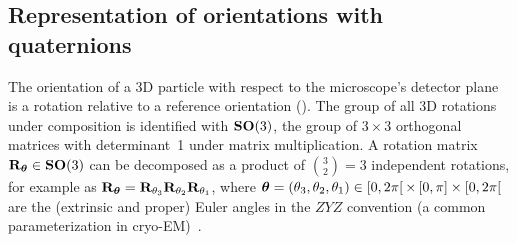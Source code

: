 
\subsection{Representation of orientations with quaternions}\label{sec:method:orientation-representation}

The orientation of a 3D particle with respect to the microscope's detector plane is a rotation relative to a reference orientation ().
The group of all 3D rotations under composition is identified with $\mathrm{\mathbf{SO}}(3)$, the group of $3 \times 3$ orthogonal matrices with determinant~1 under matrix multiplication.
A rotation matrix $\mathbf{R}_{{\boldsymbol{\theta}}} \in \mathrm{\mathbf{SO}}(3)$ can be decomposed as a product of $\binom{3}{2}=3$ independent rotations, for example as $\mathbf{R}_{{\boldsymbol{\theta}}} = \mathbf{R}_{\theta_3} \mathbf{R}_{\theta_2} \mathbf{R}_{\theta_1}$, where ${\boldsymbol{\theta}} = (\theta_3,\theta_2,\theta_1) \in [0,2\pi[ \, \times \, [0,\pi] \times [0,2\pi[$ are the (extrinsic and proper) Euler angles in the $ZYZ$ convention (a common parameterization in cryo-EM)~\cite{sorzano2014interchanging}.

